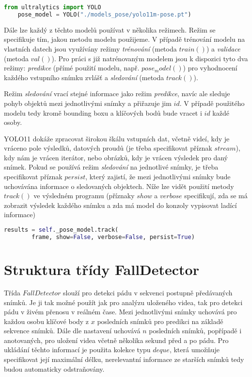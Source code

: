 \begin{lstlisting}[language=Python, label=src:params, caption={Inicializace modelu $YOLO11m-pose$}]    
    from ultralytics import YOLO    
    pose_model = YOLO("./models_pose/yolo11m-pose.pt")
\end{lstlisting}

Dále lze každý z těchto modelů používat v několika režimech. Režim se
specifikuje tím, jakou metodu modelu použijeme. V případě trénování modelu na
vlastních datech jsou využívány režimy \textit{trénování} (metoda $train()$) a
\textit{validace} (metoda $val()$). Pro práci s již natrénovaným modelem jsou k
dispozici tyto dva režimy: \textit{predikce} (přímé použití modelu, např.
$pose_model()$) pro vyhodnocení každého vstupního snímku zvlášť a
\textit{sledování} (metoda $track()$).

Režim \textit{sledování} vrací stejné informace jako režim \textit{predikce},
navíc ale sleduje pohyb objektů mezi jednotlivými snímky a přiřazuje jim $id$.
V případě použitého modelu tedy kromě bounding boxu a klíčových bodů bude
vracet i $id$ každé osoby.

YOLO11 dokáže zpracovat širokou škálu vstupních dat, včetně videí, kdy je
vráceno pole výsledků, datových proudů (je třeba specifikovat příznak
$stream$), kdy nám je vrácen iterátor, nebo obrázků, kdy je vrácen výsledek pro
daný snímek. Pokud se používá režim \textit{sledování} na jednotlivé snímky, je
třeba specifikovat příznak $persist$, který zajistí, že mezi jednotlivými
snímky bude uchovávána informace o sledovaných objektech. Níže lze vidět
použití metody $track()$ ve výsledném programu (příznaky $show$ a $verbose$
specifikují, zda se má zobrazit výsledek každého snímku a zda má model do
konzoly vypisovat ladící informace)

\begin{lstlisting}[language=Python, label=src:params, caption={Použití sledování pomocí YOLO11}]
    results = self._pose_model.track(
        frame, show=False, verbose=False, persist=True)
\end{lstlisting}

\section{Struktura třídy FallDetector}

Třída $FallDetector$ slouží pro detekci pádu v sekvenci postupně předávaných
snímků. Je ji tak možné použít jak pro analýzu uloženého videa, tak pro detekci
pádu v živém přenosu v reálném čase. Mezi jednotlivými snímky uchovává pro
každou osobu klíčové body z $x$ posledních snímků pro predikci na základě
sekvence snímků. Dále dle nastavení uchovává $n$ posledních snímků, popřípadě i
anotovaných, pro uložení videa včetně několika sekund před a po pádu. Pro
ukládání těchto informací je použita kolekce typu $deque$, která umožňuje
specifikovat její maximální délku, nerelevantní informace ze starších snímků
tedy budou automaticky odstraňovány.

